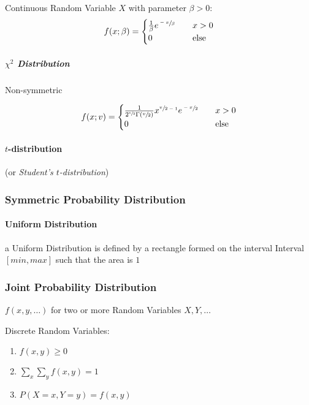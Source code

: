 Continuous Random Variable $X$ with parameter $\beta > 0$:
\[
  f(x; \beta) =
  \begin{cases}
  \frac{1}{\beta} e^{\sfrac{-x}{\beta}}     & \quad x > 0 \\
  0     & \quad\text{else} \\
  \end{cases}
\]



\subparagraph{$\chi^2$ Distribution}\label{sec:chi_squared}\hfill

Non-symmetric

\[
  f(x; v) =
  \begin{cases}
  \frac{1}{2^{\sfrac{v}{2}}\Gamma(\sfrac{v}{2})} x^{\sfrac{v}{2-1}} e^{\sfrac{-x}{2}}     & \quad x > 0 \\
  0     & \quad\text{else} \\
  \end{cases}
\]



\paragraph{$t$-distribution}\label{sec:t_distribution}\hfill

(or \emph{Student's $t$-distribution})



\subsubsection{Symmetric Probability Distribution}
\label{sec:symmetric_probability}

\paragraph{Uniform Distribution}\label{sec:uniform_distribution}\hfill

a Uniform Distribution is defined by a rectangle formed on the interval Interval
$[min,max]$ such that the area is $1$



\subsubsection{Joint Probability Distribution}
\label{sec:joint_probability}

$f(x,y,\ldots)$ for two or more Random Variables $X,Y,\ldots$

Discrete Random Variables:
\begin{enumerate}
  \item $f(x,y) \geq 0$
  \item $\sum_x \sum_y f(x,y) = 1$
  \item $P(X = x, Y = y) = f(x,y)$
\end{enumerate}

